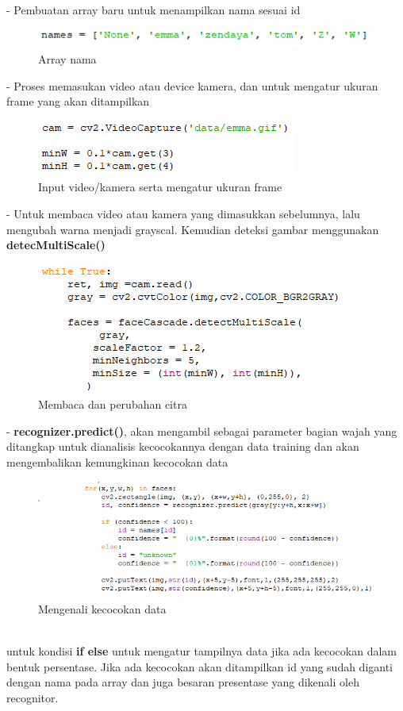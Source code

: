 \begin{enumerate}[1.]
- Pembuatan array baru untuk menampilkan nama sesuai id 
\begin{figure}[h!]
    \centering
    \includegraphics[width=0.75\linewidth]{images/recognition_5.PNG}
    \caption{Array nama}
\end{figure}

- Proses memasukan video atau device kamera, dan untuk mengatur ukuran frame yang akan ditampilkan
\begin{figure}[h!]
    \centering
    \includegraphics[width=0.75\linewidth]{images/recognition_6.PNG}
    \caption{Input video/kamera serta mengatur ukuran frame}
\end{figure}
\newpage
- Untuk membaca video atau kamera yang dimasukkan sebelumnya, lalu mengubah warna menjadi grayscal. 
Kemudian deteksi gambar menggunakan \textbf{detecMultiScale()}
\begin{figure}[h!]
    \centering
    \includegraphics[width=0.7\linewidth]{images/recognition_7.PNG}
    \caption{Membaca dan perubahan citra}
\end{figure}

- \textbf{recognizer.predict()}, akan mengambil sebagai parameter bagian 
wajah yang ditangkap untuk dianalisis kecocokannya dengan data training dan akan mengembalikan kemungkinan kecocokan data
\begin{figure}[h!]
    \centering
    \includegraphics[width=1\linewidth]{images/recognition_8.PNG}
    \caption{Mengenali kecocokan data}
\end{figure}\\
untuk kondisi \textbf{if else} untuk mengatur tampilnya data jika ada kecocokan dalam bentuk persentase.
Jika ada kecocokan akan ditampilkan id yang sudah diganti dengan nama pada array dan juga besaran presentase 
yang dikenali oleh recognitor.


\end{enumerate}
